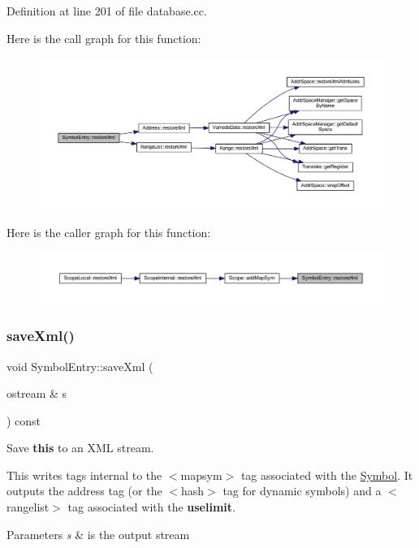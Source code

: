 Definition at line 201 of file database.\+cc.

Here is the call graph for this function\+:
\nopagebreak
\begin{figure}[H]
\begin{center}
\leavevmode
\includegraphics[width=350pt]{class_symbol_entry_a6117b39bc8d1a12e3cba724dab6dff3f_cgraph}
\end{center}
\end{figure}
Here is the caller graph for this function\+:
\nopagebreak
\begin{figure}[H]
\begin{center}
\leavevmode
\includegraphics[width=350pt]{class_symbol_entry_a6117b39bc8d1a12e3cba724dab6dff3f_icgraph}
\end{center}
\end{figure}
\mbox{\label{class_symbol_entry_a4d81d9bb16fee6c63a169680073dd28b}} 
\subsubsection{\texorpdfstring{saveXml()}{saveXml()}}
{\footnotesize\ttfamily void Symbol\+Entry\+::save\+Xml (\begin{DoxyParamCaption}\item[{ostream \&}]{s }\end{DoxyParamCaption}) const}



Save {\bfseries{this}} to an X\+ML stream. 

This writes tags internal to the $<$mapsym$>$ tag associated with the \mbox{\hyperlink{class_symbol}{Symbol}}. It outputs the address tag (or the $<$hash$>$ tag for dynamic symbols) and a $<$rangelist$>$ tag associated with the {\bfseries{uselimit}}. 
\begin{DoxyParams}{Parameters}
{\em s} & is the output stream \\
\hline
\end{DoxyParams}


